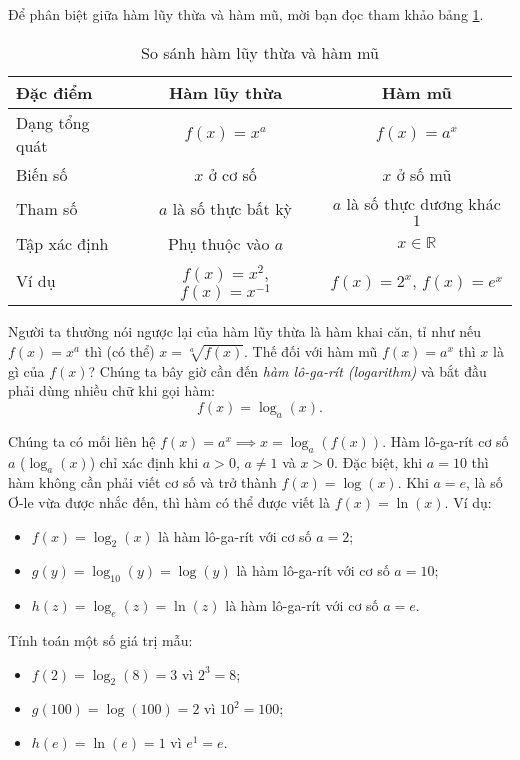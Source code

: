 \documentclass[a4paper, titlepage, openany]{book}
\begin{document}
Để phân biệt giữa hàm lũy thừa và hàm mũ, mời bạn đọc tham khảo bảng \ref{tab:bảng so sánh lũy thừa số mũ}.
\begin{table}[h]
\centering
\begin{tabular}{|l|c|c|}
\hline
\textbf{Đặc điểm} & \textbf{Hàm lũy thừa} & \textbf{Hàm mũ} \\
\hline
Dạng tổng quát & $f(x) = x^a$ & $f(x) = a^x$ \\
\hline
Biến số & $x$ ở cơ số & $x$ ở số mũ \\
\hline
Tham số & $a$ là số thực bất kỳ & $a$ là số thực dương khác $1$\\
\hline
Tập xác định & Phụ thuộc vào $a$ & $x \in \mathbb{R}$ \\
\hline
Ví dụ & $f(x) = x^2$, $f(x) = x^{-1}$ & $f(x) = 2^x$, $f(x) = e^x$ \\
\hline
\end{tabular}
\caption{So sánh hàm lũy thừa và hàm mũ}
\label{tab:bảng so sánh lũy thừa số mũ}
\end{table}

Người ta thường nói ngược lại của hàm lũy thừa là hàm khai căn, tỉ như nếu $f(x) = x^a$ thì (có thể) $x = \sqrt[a]{f(x)}$. Thế đối với hàm mũ $f(x) = a^x$ thì $x$ là gì của $f(x)$? Chúng ta bây giờ cần đến \emph{hàm lô-ga-rít (logarithm)} và bắt đầu phải dùng nhiều chữ khi gọi hàm: $$f(x) = \log_a {\left(x\right)}.$$

Chúng ta có mối liên hệ $f(x) = a^x \implies x = \log_a {\left(f(x)\right)}$. Hàm lô-ga-rít cơ số $a$ ($\log_a {\left(x\right)}$) chỉ xác định khi $a > 0$, $a \neq 1$ và $x > 0$. Đặc biệt, khi $a = 10$ thì hàm không cần phải viết cơ số và trở thành $f(x) = \log(x)$. Khi $a = e$, là số Ơ-le vừa được nhắc đến, thì hàm có thể được viết là $f(x) = \ln(x)$. Ví dụ:
\begin{itemize}
   \item $f(x) = \log_2 (x)$ là hàm lô-ga-rít với cơ số $a = 2$;
   \item $g(y) = \log_{10} (y) = \log(y)$ là hàm lô-ga-rít với cơ số $a = 10$;
   \item $h(z) = \log_e (z)=\ln(z)$ là hàm lô-ga-rít với cơ số $a = e$.
\end{itemize}
Tính toán một số giá trị mẫu:
\begin{itemize}
   \item $f(2) = \log_2 (8) = 3$ vì $2^3 = 8$;
   \item $g(100) = \log (100) = 2$ vì $10^2 = 100$;
   \item $h(e) = \ln (e) = 1$ vì $e^1 = e$.
\end{itemize} 
\end{document}
